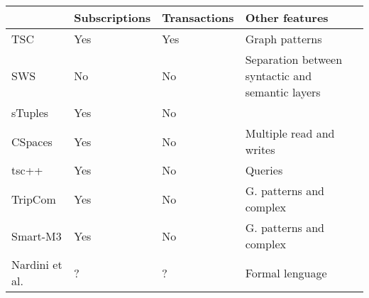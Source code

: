 
\begin{table}[htbp]
\caption{}

\begin{tabular}{ l l l p{4cm} }
\hline 
  & Subscriptions  & Transactions  & Other features \tabularnewline
\hline 
 TSC & Yes  & Yes  & Graph patterns \tabularnewline
 SWS & No  & No  & Separation between syntactic and semantic layers \tabularnewline
 sTuples & Yes  & No  &  \tabularnewline
 CSpaces & Yes  & No  & Multiple read and writes \tabularnewline %
 tsc++ & Yes  & No  & Queries \tabularnewline
 TripCom & Yes  & No  & G. patterns and complex \tabularnewline
 Smart-M3 & Yes  & No  & G. patterns and complex \tabularnewline
 Nardini et al. & ? & ?  & Formal lenguage \tabularnewline
\hline 
\end{tabular}\label{} 
\end{table}